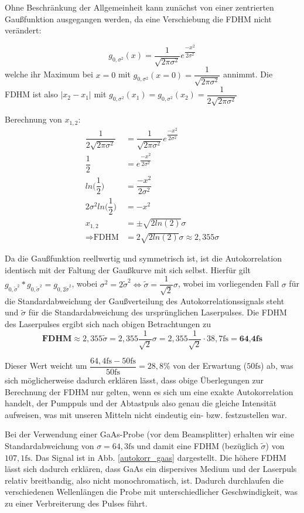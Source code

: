 Ohne Beschränkung der Allgemeinheit kann zunächst von einer zentrierten Gaußfunktion ausgegangen werden, da eine Verschiebung die FDHM nicht verändert:

\[g_{0,\sigma^2}(x)=\dfrac{1}{\sqrt{2\pi\sigma^2}}e^{\dfrac{-x^2}{2\sigma^2}}\]
welche ihr Maximum bei $x=0$ mit $g_{0,\sigma^2}(x=0)=\dfrac{1}{\sqrt{2\pi\sigma^2}}$ annimmt. Die FDHM ist also $|x_{2}-x_{1}|$ mit $g_{0,\sigma^2}(x_{1})=g_{0,\sigma^2}(x_{2})=\dfrac{1}{2\sqrt{2\pi\sigma^2}}$

Berechnung von $x_{1,2}$:
\begin{align*}
\dfrac{1}{2\sqrt{2\pi\sigma^2}}&=\dfrac{1}{\sqrt{2\pi\sigma^2}}e^{\dfrac{-x^2}{2\sigma^2}}\\
\dfrac{1}{2}&=e^{\dfrac{-x^2}{2\sigma^2}}\\
ln\Big(\dfrac{1}{2}\Big)&=\dfrac{-x^2}{2\sigma^2}\\
2\sigma^2ln\Big(\dfrac{1}{2}\Big)&=-x^2\\
x_{1,2}&=\pm\sqrt{2ln(2)}\sigma\\
\Rightarrow \text{FDHM}&=2\sqrt{2ln(2)}\sigma\approx2,355\sigma
\end{align*}

Da die Gaußfunktion reellwertig und symmetrisch ist, ist die Autokorrelation identisch mit der Faltung der Gaußkurve mit sich selbst. Hierfür gilt $g_{0,\tilde{\sigma}^2} \ast g_{0,\tilde{\sigma}^2} = g_{0,2\tilde{\sigma}^2}$, wobei $\sigma^2=2\tilde{\sigma}^2 \Leftrightarrow \tilde{\sigma}=\dfrac{1}{\sqrt{2}}\sigma$, wobei im vorliegenden Fall $\sigma$ für die Standardabweichung der Gaußverteilung des Autokorrelationssignals steht und $\tilde{\sigma}$ für die Standardabweichung des ursprünglichen Laserpulses. Die FDHM des Laserpulses ergibt sich nach obigen Betrachtungen zu \[\textbf{FDHM}\approx2,355\tilde{\sigma}=2,355\dfrac{1}{\sqrt{2}}\sigma=2,355\dfrac{1}{\sqrt{2}}\cdot 38,7\si{\femto\second}= \textbf{64,4fs}\]

Dieser Wert weicht um $\dfrac{64,4\si{\femto\second}-50\si{\femto\second}}{50\si{\femto\second}}=28,8\%$ von der Erwartung ($50\si{\femto\second}$) ab, was sich möglicherweise dadurch erklären lässt, dass obige Überlegungen zur Berechnung der FDHM nur gelten, wenn es sich um eine exakte Autokorrelation handelt, der Pumppuls und der Abtastpuls also genau die gleiche Intensität aufweisen, was mit unseren Mitteln nicht eindeutig ein- bzw. festzustellen war.

Bei der Verwendung einer GaAs-Probe (vor dem Beamsplitter) erhalten wir eine Standardabweichung von $\sigma=64,3\si{\femto\second}$ und damit eine FDHM (bezüglich $\tilde{\sigma}$) von $107,1\si{\femto\second}$. Das Signal ist in Abb. \ref{autokorr_gaas} dargestellt. Die höhere FDHM lässt sich dadurch erklären, dass GaAs ein dispersives Medium und der Laserpuls relativ breitbandig, also nicht monochromatisch, ist. Dadurch durchlaufen die verschiedenen Wellenlängen die Probe mit unterschiedlicher Geschwindigkeit, was zu einer Verbreiterung des Pulses führt.


